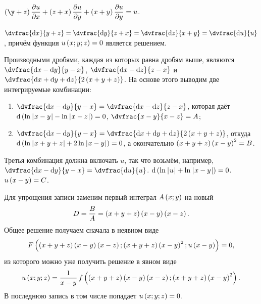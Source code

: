 \documentclass[a5paper,10pt]{article}
\begin{document}
    $\br{\y + z} \parder{u} {x} + \br{z + x} \parder{u} {y} + \br{x + y} \parder{u} {y} = u$.
    
    $\dvfrac {\di x} {y + z} 
    = \dvfrac {\di y} {z + x} 
    = \dvfrac {\di z} {x + y} 
    = \dvfrac {\di u} {u}$,
    причём функция $u\left(\hspace{0.01em}x; y; z\hspace{0.01em}\right) = 0$ является решением.
    
    Производными дробями, каждая из которых равна дробям выше, являются
    $\dvfrac{\di x - \di y}{y - x}$,
    $\dvfrac{\di x - \di z}{z - x}$ и
    $\dvfrac{\di x + \di y + \di z}{2\br{x + y + z}}$.
    На основе этого выводим две интегрируемые комбинации: 
    \begin{enumerate}
        \item $\dvfrac{\di x - \di y}{y - x} = \dvfrac{\di x - \di z}{z - x}$,
        которая даёт $\di \br{\ln\vbr{x - y} - \ln\vbr{x - z}} = 0$,
        $\dvfrac{x - y}{x - z} = A$;

        \item $\dvfrac{\di x - \di y}{y - x} = \dvfrac{\di x + \di y + \di z}{2\br{x + y + z}}$, откуда
        $\di\br{\ln\vbr{x + y + z} + 2\ln\vbr{x - y}} = 0$, а окончательно
        $\left(\hspace{0.01em}x + y + z\hspace{0.01em}\right) \left(\hspace{0.01em}x - y\hspace{0.01em}\right)^2 = B$.
    \end{enumerate}
    Третья комбинация должна включать $u$, так что возьмём, например,
    $\dvfrac{\di x - \di y}{y - x} = \dvfrac{\di u}{u}$.
    $\di\br{\ln\vbr{u} + \ln\vbr{x - y}} = 0$.
    $u\left(\hspace{0.01em}x - y\hspace{0.01em}\right) = C$.

    Для упрощения записи заменим первый интеграл $A\left(\hspace{0.01em}x; y\hspace{0.01em}\right)$ на новый
    $$D = \dfrac{B}{A} = \left(\hspace{0.01em}x + y + z\hspace{0.01em}\right)\left(\hspace{0.01em}x - y\hspace{0.01em}\right)\left(\hspace{0.01em}x - z\hspace{0.01em}\right).$$
    Общее решение получаем сначала в неявном виде
    $$F\left(\hspace{0.01em}\left(\hspace{0.01em}x + y + z\hspace{0.01em}\right)\left(\hspace{0.01em}x - y\hspace{0.01em}\right)\left(\hspace{0.01em}x - z\hspace{0.01em}\right); \left(\hspace{0.01em}x + y + z\hspace{0.01em}\right) \left(\hspace{0.01em}x - y\hspace{0.01em}\right)^2; u\left(\hspace{0.01em}x - y\hspace{0.01em}\right)\hspace{0.01em}\right) = 0,$$
    из которого можно уже получить решение в явном виде
    $$u\left(\hspace{0.01em}x; y; z\hspace{0.01em}\right) = \dfrac{1}{x - y}\, f\left(\hspace{0.01em}\left(\hspace{0.01em}x + y + z\hspace{0.01em}\right)\left(\hspace{0.01em}x - y\hspace{0.01em}\right)\left(\hspace{0.01em}x - z\hspace{0.01em}\right); \left(\hspace{0.01em}x + y + z\hspace{0.01em}\right) \left(\hspace{0.01em}x - y\hspace{0.01em}\right)^2\hspace{0.01em}\right).$$
    В последнюю запись в том числе попадает $u\left(\hspace{0.01em}x; y; z\hspace{0.01em}\right) = 0$.
\end{document}
